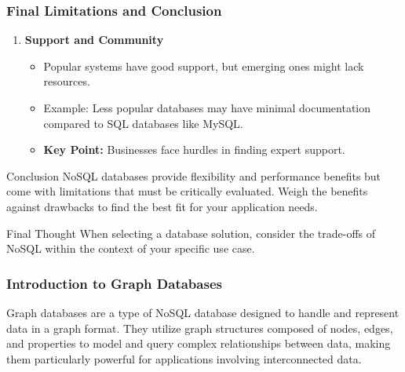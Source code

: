 \documentclass[aspectratio=169]{beamer}
\begin{document}
\begin{frame}[fragile]
    \frametitle{Final Limitations and Conclusion}
    \begin{enumerate}[resume]
        \item \textbf{Support and Community}
            \begin{itemize}
                \item Popular systems have good support, but emerging ones might lack resources.
                \item Example: Less popular databases may have minimal documentation compared to SQL databases like MySQL.
                \item \textbf{Key Point:} Businesses face hurdles in finding expert support.
            \end{itemize}
    \end{enumerate}
    
    \begin{block}{Conclusion}
        NoSQL databases provide flexibility and performance benefits but come with limitations that must be critically evaluated. Weigh the benefits against drawbacks to find the best fit for your application needs.
    \end{block}
    
    \begin{block}{Final Thought}
        When selecting a database solution, consider the trade-offs of NoSQL within the context of your specific use case.
    \end{block}
\end{frame}

\begin{frame}[fragile]
    \frametitle{Introduction to Graph Databases}
    Graph databases are a type of NoSQL database designed to handle and represent data in a graph format. 
    They utilize graph structures composed of nodes, edges, and properties to model and query complex relationships between data, 
    making them particularly powerful for applications involving interconnected data.
\end{frame}
\end{document}
